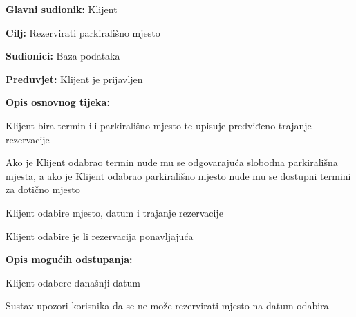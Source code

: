                         \noindent {}
					\begin{packed_item}
	
						\item \textbf{Glavni sudionik: }Klijent
						\item  \textbf{Cilj:} Rezervirati parkirališno mjesto
						\item  \textbf{Sudionici:} Baza podataka
						\item  \textbf{Preduvjet:} Klijent je prijavljen
						\item  \textbf{Opis osnovnog tijeka:}
						
						\item[] \begin{packed_enum}
	
							\item Klijent bira termin ili parkirališno mjesto te upisuje predviđeno trajanje rezervacije
							\item Ako je Klijent odabrao termin nude mu se odgovarajuća slobodna parkirališna mjesta, a ako je Klijent odabrao parkirališno mjesto nude mu se dostupni termini za dotično mjesto
							\item Klijent odabire mjesto, datum i trajanje rezervacije
                            \item Klijent odabire je li rezervacija ponavljajuća
							
						\end{packed_enum}

						\item  \textbf{Opis mogućih odstupanja:}
						
						\item[] \begin{packed_item}
	
							\item[1.a ILI 3.a] Klijent odabere današnji datum
							\item[] \begin{packed_enum}
								
								\item Sustav upozori korisnika da se ne može rezervirati mjesto na datum odabira
								
								
							\end{packed_enum}
	
							
						\end{packed_item}	

					\end{packed_item}

